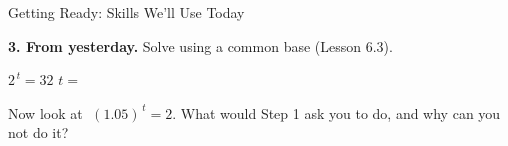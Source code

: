 \documentclass[10pt]{article}
\begin{document}
\begin{notesbox}{Getting Ready: Skills We'll Use Today}
\vspace{0.22in}

\textbf{3. From yesterday.} Solve using a common base (Lesson 6.3).

\vspace{4pt}
\hspace*{1.2em} $2^{\,t} = 32$ \hfill $t=$ \blank{2.0cm}

\vspace{6pt}
\hspace*{1.2em} Now look at $\;(1.05)^{\,t} = 2$. \; What would Step 1 ask you to do, and why can you
not do it? \writeline

\end{notesbox}
\end{document}
